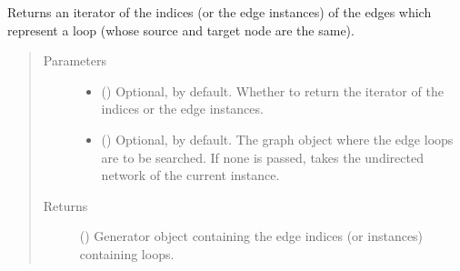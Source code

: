 \documentclass[letterpaper,10pt,english]{sphinxmanual}
\begin{document}
\begin{fulllineitems}
\begin{fulllineitems}
\begin{quote}
\begin{description}
\begin{itemize}
\end{itemize}


\end{description}\end{quote}

\end{fulllineitems}


\begin{fulllineitems}
\label{\detokenize{main:pypath.main.PyPath.loop_edges}}
Returns an iterator of the indices (or the edge instances) of
the edges which represent a loop (whose source and target node
are the same).
\begin{quote}\begin{description}
\item[{Parameters}] \leavevmode\begin{itemize}
\item {} 
 () \textendash{} Optional,  by default. Whether to return the
iterator of the indices or the edge instances.

\item {} 
 () \textendash{} Optional,  by default. The graph object where the
edge loops are to be searched. If none is passed, takes the
undirected network of the current instance.

\end{itemize}

\item[{Returns}] \leavevmode
() \textendash{} Generator object containing the edge
indices (or instances) containing loops.

\end{description}\end{quote}

\end{fulllineitems}



\end{fulllineitems}
\end{document}
